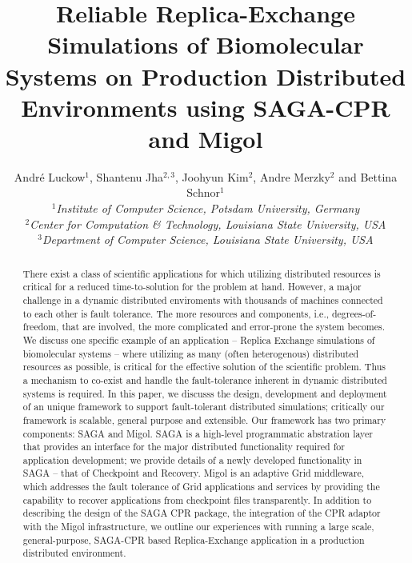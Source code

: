 \documentclass[times, 10pt,twocolumn]{article}
\title{Reliable Replica-Exchange Simulations of Biomolecular Systems
  on Production Distributed Environments using SAGA-CPR and Migol}
\author{
  Andr\'e Luckow$^{1}$, Shantenu Jha$^{2,3}$, Joohyun Kim$^{2}$, Andre Merzky$^{2}$ and Bettina Schnor$^{1}$\\
  \small{\emph{$^{1}$Institute of Computer Science, Potsdam University, Germany}}\\
  \small{\emph{$^{2}$Center for Computation \& Technology, Louisiana State University, USA}}\\
  \small{\emph{$^{3}$Department of Computer Science, Louisiana State University, USA}}\\
}
\begin{document}
 


\maketitle    

\begin{abstract}
  There exist a class of scientific applications for which utilizing
  distributed resources is critical for a reduced time-to-solution for
  the problem at hand. However, a major challenge in a dynamic
  distributed enviroments with thousands of machines connected to each
  other is fault tolerance. The more resources and components, i.e.,
  degrees-of-freedom, that are involved, the more complicated and
  error-prone the system becomes.  We discuss one specific example of
  an application -- Replica Exchange simulations of biomolecular
  systems -- where utilizing as many (often heterogenous) distributed
  resources as possible, is critical for the effective solution of the
  scientific problem.  Thus a mechanism to co-exist and handle the
  fault-tolerance inherent in dynamic distributed systems is
  required. In this paper, we discusss the design, development and
  deployment of an unique framework to support fault-tolerant
  distributed simulations; critically our framework is scalable,
  general purpose and extensible. Our framework has two primary
  components: SAGA and Migol.  SAGA is a high-level programmatic
  abstration layer that provides an interface for the major
  distributed functionality required for application development; we
  provide details of a newly developed functionality in SAGA -- that
  of Checkpoint and Recovery. Migol is an adaptive Grid middleware,
  which addresses the fault tolerance of Grid applications and
  services by providing the capability to recover applications from
  checkpoint files transparently.  In addition to describing the
  design of the SAGA CPR package, the integration of the CPR adaptor
  with the Migol infrastructure, we outline our experiences with
  running a large scale, general-purpose, SAGA-CPR based
  Replica-Exchange application in a production distributed
  environment.

    
\end{abstract}
\end{document}
